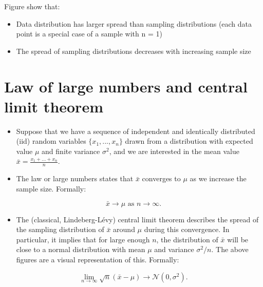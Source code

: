 \documentclass[
  letterpaper,
  DIV=11,
  numbers=noendperiod]{scrreprt}
\providecommand{\tightlist}{%
  \setlength{\itemsep}{0pt}\setlength{\parskip}{0pt}}\usepackage{longtable,booktabs,array}
\begin{document}
Figure show that:

\begin{itemize}
\item
  Data distribution has larger spread than sampling distributions (each
  data point is a special case of a sample with n = 1)
\item
  The spread of sampling distributions decreases with increasing sample
  size
\end{itemize}

\hypertarget{law-of-large-numbers-and-central-limit-theorem}{%
\section{Law of large numbers and central limit
theorem}\label{law-of-large-numbers-and-central-limit-theorem}}

\begin{itemize}
\item
  Suppose that we have a sequence of independent and identically
  distributed (iid) random variables \(\{x_1, ..., x_n\}\) drawn from a
  distribution with expected value \(\mu\) and finite variance
  \(\sigma^2\), and we are interested in the mean value
  \(\bar{x} = \frac{x_1 + ... + x_n}{n}\).
\item
  The law or large numbers states that \(\bar{x}\) converges to \(\mu\)
  as we increase the sample size. Formally:
\end{itemize}

\[
\bar{x} \rightarrow \mu \text{ as } n \rightarrow \infty.
\]

\begin{itemize}
\tightlist
\item
  The (classical, Lindeberg-Lévy) central limit theorem describes the
  spread of the sampling distribution of \(\bar{x}\) around \(\mu\)
  during this convergence. In particular, it implies that for large
  enough \(n\), the distribution of \(\bar{x}\) will be close to a
  normal distribution with mean \(\mu\) and variance \(\sigma^2/n\). The
  above figures are a visual representation of this. Formally:
\end{itemize}

\[
\lim _{n\to\infty} \sqrt{n}(\bar{x} - \mu) \rightarrow \mathcal{N}\left(0,\sigma ^{2}\right).
\]
\end{document}
